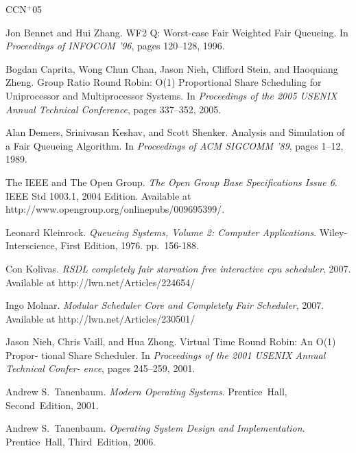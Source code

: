 \documentclass[11pt,a4paper,oneside]{book}
\begin{document}


\frontmatter




\tableofcontents


\mainmatter







\appendix




\normalsize
\begin{thebibliography}{CCN$^+$05}

 Jon Bennet and Hui Zhang. WF2 Q: Worst-case Fair Weighted Fair Queueing. 
  In \emph{Proceedings of INFOCOM ’96}, pages 120–128, 1996.

 Bogdan Caprita, Wong Chun Chan, Jason Nieh, Clifford Stein, and Haoquiang Zheng.
  Group Ratio Round Robin: O(1) Proportional Share Scheduling for Uniprocessor and
  Multiprocessor Systems. In \emph{Proceedings of the 2005 USENIX Annual Technical Conference}, pages 337–352, 2005.

 Alan Demers, Srinivasan Keshav, and Scott Shenker. Analysis and Simulation of a Fair
  Queueing Algorithm. In \emph{Proceedings of ACM SIGCOMM ’89}, pages 1–12, 1989.

 The IEEE and The Open Group. \emph{The Open Group Base Specifications Issue 6}.
IEEE Std 1003.1, 2004 Edition. Available at http://www.opengroup.org/onlinepubs/009695399/.

 Leonard Kleinrock. \emph{Queueing Systems, Volume 2: Computer Applications}.
Wiley-Interscience, First Edition, 1976. pp.~156-188.

 Con Kolivas. \emph{RSDL completely fair starvation free interactive cpu scheduler}, 2007.
Available at http://lwn.net/Articles/224654/

 Ingo Molnar. \emph{Modular Scheduler Core and Completely Fair Scheduler}, 2007.
Available at http://lwn.net/Articles/230501/

 Jason Nieh, Chris Vaill, and Hua Zhong. Virtual Time Round Robin: An O(1) Propor-
  tional Share Scheduler. In \emph{Proceedings of the 2001 USENIX Annual Technical Confer-
  ence}, pages 245–259, 2001.


 Andrew S.~Tanenbaum. \emph{Modern Operating Systems}.
Prentice~Hall, Second~Edition, 2001.

 Andrew S.~Tanenbaum. \emph{Operating System Design and Implementation}. 
Prentice~Hall, Third~Edition, 2006.

\end{thebibliography}
\end{document}
